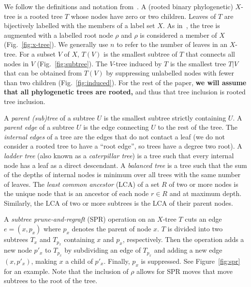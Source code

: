 \documentclass[11pt,onecolumn,conference]{IEEEtran}
\begin{document}
We follow the definitions and notation from~\cite{bordewich05,whidden2013hybridization, Whidden2015-yi}.
A (rooted binary phylogenetic) $X$-tree is a rooted tree $T$ whose nodes have zero or two children.
Leaves of $T$ are bijectively labelled with the members of a label set $X$.
As in~\cite{bordewich05,whidden2013hybridization,Whidden2015-yi}, the tree is augmented with a labelled root node $\rho$ and $\rho$ is considered a member of $X$ (Fig.~\ref{fig:x-tree}).
We generally use $n$ to refer to the number of leaves in an $X$-tree.
For a subset $V$ of $X$, $T(V)$ is the smallest subtree of $T$ that connects all nodes in $V$ (Fig.~\ref{fig:subtree}).
The $V$-tree induced by $T$ is the smallest tree $T|V$ that can be obtained from $T(V)$ by suppressing unlabelled nodes with fewer than two children (Fig.~\ref{fig:induced}).
For the rest of the paper, \textbf{we will assume that all phylogenetic trees are rooted,} and thus that tree inclusion is rooted tree inclusion.

A \emph{parent (sub)tree} of a subtree $U$ is the smallest subtree strictly containing $U$.
A \emph{parent edge} of a subtree $U$ is the edge connecting $U$ to the rest of the tree.
The \emph{internal edges} of a tree are the edges that do not contact a leaf (we do not consider a rooted tree to have a ``root edge'', so trees have a degree two root). 
A \emph{ladder tree} (also known as a \emph{caterpillar tree}) is a tree such that every internal node has a leaf as a direct descendant.
A \emph{balanced tree} is a tree such that the sum of the depths of internal nodes is minimum over all trees with the same number of leaves.
The \emph{least common ancestor} (LCA) of a set $R$ of two or more nodes is the unique node that is an ancestor of each node $r \in R$ and at maximum depth.
Similarly, the LCA of two or more subtrees is the LCA of their parent nodes.

A \emph{subtree prune-and-regraft} (SPR) operation on an $X$-tree $T$ cuts an edge $e = (x, p_x)$ where $p_x$ denotes the parent of node $x$.
$T$ is divided into two subtrees $T_x$ and $T_{p_x}$ containing $x$ and $p_x$, respectively.
Then the operation adds a new node $p'_x$ to $T_{p_x}$ by subdividing an edge of $T_{p_x}$ and adding a new edge $(x, p'_x)$, making $x$ a child of $p'_x$.
Finally, $p_x$ is suppressed.
See Figure~\ref{fig:spr} for an example.
Note that the inclusion of $\rho$ allows for SPR moves that move subtrees to the root of the tree.
\end{document}
